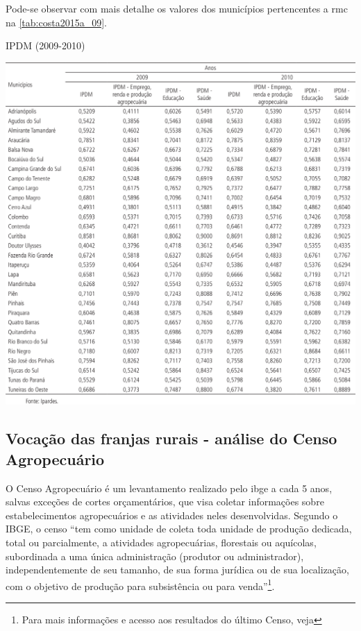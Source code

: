 	Pode-se observar com mais detalhe os valores dos municípios pertencentes a \gls{rmc} na \autoref{tab:costa2015a_09}.
		
	\begin{table}
		\centering
		\caption{IPDM (2009-2010)}
		\includegraphics[width=1.0\linewidth]{img/costa2015a_09}
		\label{tab:costa2015a_09}
	\end{table}
	

	\subsection{Vocação das franjas rurais - análise do Censo Agropecuário} \label{sec:franjas}
	
	O Censo Agropecuário é um levantamento realizado pelo \gls{ibge} a cada 5 anos, salvas exceções de cortes orçamentários, que visa coletar informações sobre estabelecimentos agropecuários e as atividades neles desenvolvidas. Segundo o IBGE, o censo ``tem como unidade de coleta toda unidade de produção dedicada, total ou parcialmente, a atividades agropecuárias, florestais ou aquícolas, subordinada a uma única administração (produtor ou administrador), independentemente de seu tamanho, de sua forma jurídica ou de sua localização, com o objetivo de produção para subsistência ou para venda''\footnote{Para mais informações e acesso aos resultados do último Censo, veja }.
	
